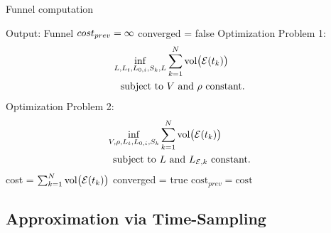 \begin{algorithm}[H]
  \caption{Funnel computation}
  \label{alg:funnelalgorithm}
  \begin{algorithmic}[0]
    \State Output: Funnel
    \State \(\mathnormal{cost}_{\mathnormal{prev}} = \infty\)
    \State converged = false
    \State Optimization Problem 1:
    \State %
    \begin{align*}
      \underset{\substack{L,L_{t},L_{0,i},S_{k},L_{}}}{\inf}&  \sum_{k=1}^{N} \operatorname{vol} \bigl( \mathcal{E}(t_{k}) \bigr) & \\    
      \text{subject to } & V \text{ and } \rho \text{ constant.}& \\
    \end{align*}
    \State Optimization Problem 2:
    \State %
    \begin{align*}
      \underset{\substack{V,\rho, L_{t},L_{0,i},S_{k}}}{\inf}&  \sum_{k=1}^{N} \operatorname{vol} \bigl( \mathcal{E}(t_{k}) \bigr) & \\    
      \text{subject to } & L \text{ and } L_{\mathcal{E},k} \text{ constant.}& \\
    \end{align*}
    \State 
    \State cost = \(\sum_{k=1}^{N} \operatorname{vol} \bigl( \mathcal{E}(t_{k}) \bigr) \)
    \State
    \State converged = true
    \EndIf
    \State \(\mathrm{cost}_{\mathit{prev}} = \mathrm{cost}\)
    \EndWhile
    \EndProcedure
  \end{algorithmic}
\end{algorithm} 


\subsection{Approximation via Time-Sampling}

